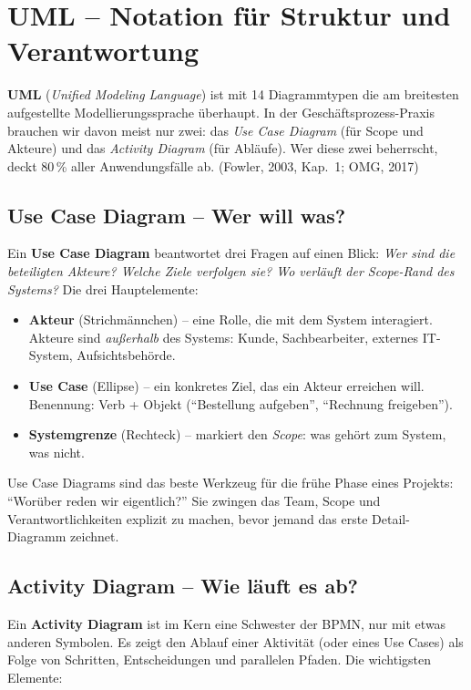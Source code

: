 \documentclass[11pt,a4paper,oneside]{article}
\newcommand{\fachbegriff}[1]{\textbf{#1}}
\newcommand{\quelle}[1]{{\footnotesize\color{lpGray}(#1)}}
\begin{document}
\section{UML -- Notation für Struktur und Verantwortung}

\fachbegriff{UML} (\emph{Unified Modeling Language}) ist mit 14 Diagrammtypen die am breitesten aufgestellte Modellierungssprache überhaupt. In der Geschäftsprozess-Praxis brauchen wir davon meist nur zwei: das \emph{Use Case Diagram} (für Scope und Akteure) und das \emph{Activity Diagram} (für Abläufe). Wer diese zwei beherrscht, deckt 80\,\% aller Anwendungsfälle ab. \quelle{Fowler, 2003, Kap.~1; OMG, 2017}

\subsection{Use Case Diagram -- Wer will was?}

Ein \fachbegriff{Use Case Diagram} beantwortet drei Fragen auf einen Blick: \emph{Wer sind die beteiligten Akteure? Welche Ziele verfolgen sie? Wo verläuft der Scope-Rand des Systems?} Die drei Hauptelemente:

\begin{itemize}
  \item \fachbegriff{Akteur} (Strichmännchen) -- eine Rolle, die mit dem System interagiert. Akteure sind \emph{außerhalb} des Systems: Kunde, Sachbearbeiter, externes IT-System, Aufsichtsbehörde.
  \item \fachbegriff{Use Case} (Ellipse) -- ein konkretes Ziel, das ein Akteur erreichen will. Benennung: Verb + Objekt (``Bestellung aufgeben'', ``Rechnung freigeben'').
  \item \fachbegriff{Systemgrenze} (Rechteck) -- markiert den \emph{Scope}: was gehört zum System, was nicht.
\end{itemize}

Use Case Diagrams sind das beste Werkzeug für die frühe Phase eines Projekts: ``Worüber reden wir eigentlich?'' Sie zwingen das Team, Scope und Verantwortlichkeiten explizit zu machen, bevor jemand das erste Detail-Diagramm zeichnet.

\subsection{Activity Diagram -- Wie läuft es ab?}

Ein \fachbegriff{Activity Diagram} ist im Kern eine Schwester der BPMN, nur mit etwas anderen Symbolen. Es zeigt den Ablauf einer Aktivität (oder eines Use Cases) als Folge von Schritten, Entscheidungen und parallelen Pfaden. Die wichtigsten Elemente:
\end{document}
